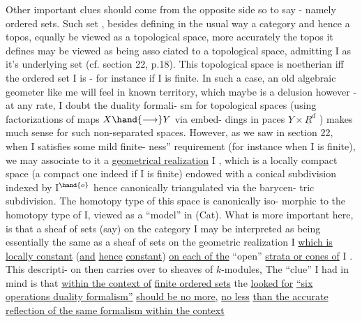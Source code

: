 Other important clues should come from the opposite side so to say
- namely ordered sets.  Such  set ,  besides defining in the usual way
a  category and hence a topos,  equally  be viewed as a topological
space,  more accurately the topos it defines may be viewed as being asso
ciated to a topological space,  admitting I as it's underlying set
(cf. section 22, p.18).  This topological space is noetherian iff the
ordered set I is -  for instance if I is finite.  In such a case, an 
old algebraic geometer like me will feel in known territory,  which
maybe is a delusion however - at any rate,  I doubt the duality formali-%
sm for topological spaces (using factorizations of maps $X\hand{\longrightarrow}Y$ via embed-%
dings in paces $Y\times\underline{R}^{d}$ ) makes much sense for such non-separated spaces.
However,  as we saw in section 22,  when I satisfies some mild  finite-%
ness'' requirement (for instance when I is finite),  we may associate to
it a \uline{geometrical realization} \hand{$|$}I\hand{$|$} ,  which is a locally compact space
(a compact one indeed if I is finite) endowed with a conical 
subdivision \hand{(}indexed by  I$^{\hand{o}}$\hand{)} hence canonically triangulated via the barycen-%
tric subdivision\deleted{)}.  The homotopy type of this space is canonically iso-%
morphic to the homotopy type of I,  viewed as a ``model'' in (Cat).  What
is more important here,  is that a sheaf of sets (say) on the category
I  may be interpreted as being essentially the same as a sheaf of sets
on the geometric realization \hand{$|$}I\hand{$|$} \uline{which is locally constant} (\uline{and} \uline{hence}
\uline{constant}) \uline{on each of the} ``open'' \uline{strata or cones of}  I .  This descripti-%
on then carries over to sheaves of $k$-modules,  The ``clue'' I had in mind
is that \uline{within the context of}   \uline{finite ordered sets}\hand{,}   the
\uline{looked for} \uline{``six operations duality formalism''} \uline{should be no more,} \uline{no less}
\uline{than the accurate reflection of the same formalism within the context}

